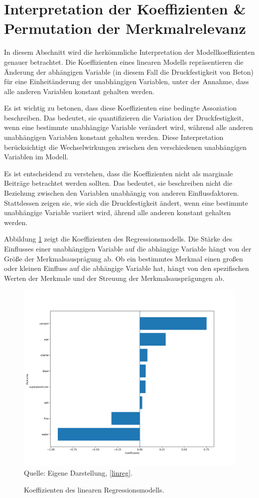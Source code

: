\section{Interpretation der Koeffizienten \& Permutation der Merkmalrelevanz}

In diesem Abschnitt wird die herkömmliche Interpretation der Modellkoeffizienten genauer betrachtet. 
Die Koeffizienten eines linearen Modells repräsentieren die Änderung der abhängigen Variable (in diesem Fall die Druckfestigkeit von Beton) 
für eine Einheitänderung der unabhängigen Variablen, unter der Annahme, dass alle anderen Variablen konstant gehalten werden.

Es ist wichtig zu betonen, dass diese Koeffizienten eine bedingte Assoziation beschreiben. 
Das bedeutet, sie quantifizieren die Variation der Druckfestigkeit, wenn eine bestimmte unabhängige Variable 
verändert wird, während alle anderen unabhängigen Variablen konstant gehalten werden. 
Diese Interpretation berücksichtigt die Wechselwirkungen zwischen den verschiedenen unabhängigen Variablen im Modell.

Es ist entscheidend zu verstehen, dass die Koeffizienten nicht als marginale Beiträge betrachtet werden sollten. 
Das bedeutet, sie beschreiben nicht die Beziehung zwischen den Variablen unabhängig von anderen Einflussfaktoren. 
Stattdessen zeigen sie, wie sich die Druckfestigkeit ändert, wenn eine bestimmte unabhängige Variable variiert wird, 
ährend alle anderen konstant gehalten werden.

Abbildung \ref{pic:coef} zeigt die Koeffizienten des Regressionsmodells. Die Stärke des Einflusses einer 
unabhängigen Variable auf die abhängige Variable hängt von der Größe der Merkmalsausprägung ab. 
Ob ein bestimmtes Merkmal einen großen oder kleinen Einfluss auf die abhängige Variable hat, hängt
von den spezifischen Werten der Merkmale und der Streuung der Merkmalsausprägungen ab. 

\begin{figure}[!h]
    \caption{Koeffizienten des linearen Regressionsmodells.}
    \includegraphics[width=1\textwidth]{../scripts/images/coef.png}
    Quelle: Eigene Darstellung, \ref{linreg}.
    \label{pic:coef}
\end{figure}


